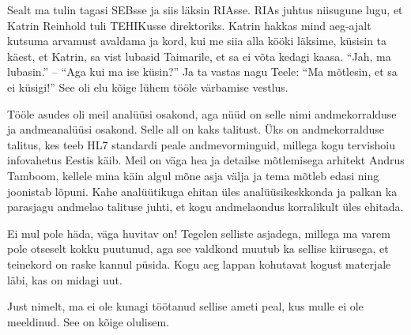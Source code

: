 Sealt ma tulin tagasi SEBsse ja siis läksin RIAsse. RIAs juhtus niisugune lugu, et Katrin 
Reinhold tuli TEHIKusse direktoriks. Katrin hakkas mind aeg-ajalt kutsuma arvamust avaldama 
ja kord, kui me siia alla kööki läksime, küsisin ta käest, et 
Katrin, sa vist lubasid Taimarile, et sa ei võta kedagi kaasa. \enquote{Jah, ma lubasin.} -- 
\enquote{Aga kui ma ise küsin?} Ja ta vastas nagu Teele: \enquote{Ma 
mõtlesin, et sa ei küsigi!} See oli elu kõige lühem tööle värbamise vestlus. 

Tööle asudes oli meil analüüsi osakond, aga nüüd on selle 
nimi andmekorralduse ja andmeanalüüsi osakond. Selle all on kaks talitust. Üks 
on andmekorralduse talitus, kes teeb HL7 standardi peale andmevorminguid, millega kogu 
tervishoiu infovahetus Eestis käib. Meil on väga hea ja detailse mõtlemisega arhitekt Andrus 
Tamboom, kellele mina 
käin algul mõne asja välja ja tema mõtleb edasi ning joonistab lõpuni. Kahe analüütikuga ehitan üles 
analüüsikeskkonda ja palkan ka parasjagu andmelao talituse juhti, et kogu 
andmelaondus korralikult üles ehitada. 


Ei mul pole häda, väga huvitav on! Tegelen 
selliste asjadega, millega ma varem pole otseselt kokku puutunud, aga see valdkond muutub ka 
sellise kiirusega, et teinekord on raske kannul püsida. Kogu aeg 
lappan kohutavat kogust materjale läbi, kas on midagi uut. 


Just nimelt, ma ei ole kunagi töötanud sellise ameti peal, kus mulle ei ole 
meeldinud. See on kõige olulisem. 